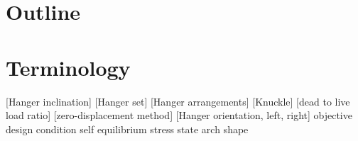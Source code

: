 \section{Outline} \label{sec:int_out}


\section{Terminology} \label{sec:int_term}
[Hanger inclination]
[Hanger set]
[Hanger arrangements]
[Knuckle]
[dead to live load ratio]
[zero-displacement method]
[Hanger orientation, left, right]
objective
design condition
self equilibrium stress state
arch shape
